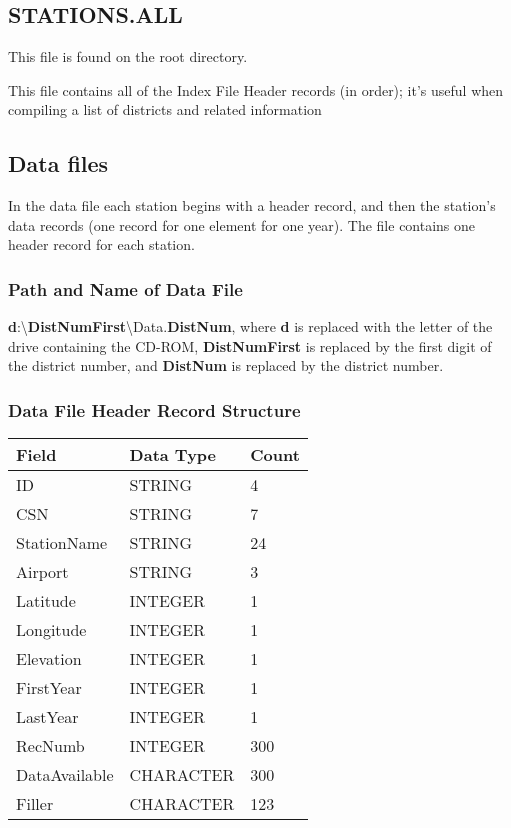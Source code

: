 \documentclass[12pt]{article}
\begin{document}
\subsection{STATIONS.ALL}
This file is found on the root directory.

This file contains all of the Index File Header records (in order); it's useful when compiling a list of districts and related information


\subsection{Data files}
In the data file each station begins with a header record, and then the station's data records (one record for one element for one year). The file contains one header record for each station.

\subsubsection{Path and Name of Data File}
\textbf{d}:\textbackslash{}\textbf{DistNumFirst}\textbackslash{}Data.\textbf{DistNum}, where \textbf{d} is replaced with the letter of the drive containing the CD-ROM, \textbf{DistNumFirst} is replaced by the first digit of the district number, and \textbf{DistNum} is replaced by the district number.

\subsubsection{Data File Header Record Structure}
\begin{center}
\begin{tabular}{l | l | l}
Field & Data Type & Count \\
\hline
ID & STRING & 4 \\
CSN & STRING & 7 \\
StationName & STRING & 24 \\
Airport & STRING & 3 \\
Latitude & INTEGER & 1 \\
Longitude & INTEGER & 1 \\
Elevation & INTEGER & 1 \\
FirstYear & INTEGER & 1 \\
LastYear & INTEGER & 1 \\
RecNumb & INTEGER & 300 \\
DataAvailable & CHARACTER & 300 \\
Filler & CHARACTER & 123
\end{tabular}
\end{center}
\end{document}
